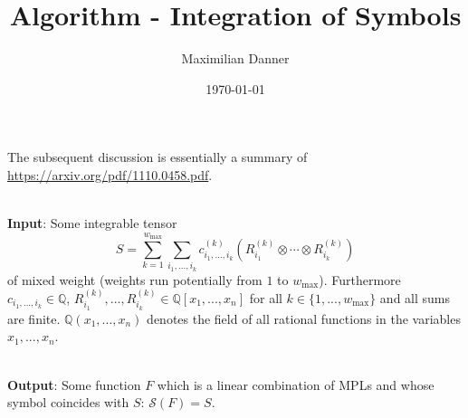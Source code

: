 \documentclass[10pt]{article}
\title{\textbf{Algorithm - Integration of Symbols}}
\author{Maximilian Danner}
\date{\today}
\newcommand*{\IQ}{\mathbb{Q}}
\newcommand*{\sff}{\mathcal{S}}
\begin{document}
\maketitle

The subsequent discussion is essentially a summary of \url{https://arxiv.org/pdf/1110.0458.pdf}.

\ \\

\textbf{Input}: Some integrable tensor 
\begin{equation}
\label{eq:inp}
S = \sum_{k = 1}^{w_{\mathrm{max}}} \sum_{i_1, ..., i_{k}} c^{(k)}_{i_1, ..., i_k} \left( R^{(k)}_{i_1} \otimes \cdots \otimes R^{(k)}_{i_k} \right)
\end{equation}
of mixed weight (weights run potentially from $1$ to $w_{\mathrm{max}}$). Furthermore $c_{i_1, ..., i_k} \in \IQ$, $R^{(k)}_{i_1}, ..., R^{(k)}_{i_k} \in \IQ[x_1, ..., x_n]$ for all $k \in \{1, ..., w_{\max}\}$ and all sums are finite. $\IQ(x_1, ..., x_n)$ denotes the field of all rational functions in the variables $x_1, ..., x_n$.

\ \\

\textbf{Output}: Some function $F$ which is a linear combination of MPLs and whose symbol coincides with $S$: $\sff(F) = S$.

\ \\
\end{document}
